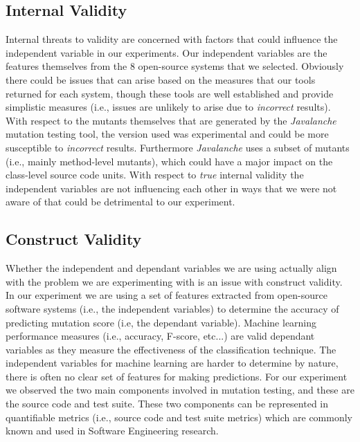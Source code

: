 \subsection{Internal Validity}
\label{subsec:conclusions_internal_validity}
Internal threats to validity are concerned with factors that could influence the independent variable in our experiments. Our independent variables are the features themselves from the 8 open-source systems that we selected. Obviously there could be issues that can arise based on the measures that our tools returned for each system, though these tools are well established and provide simplistic measures (i.e., issues are unlikely to arise due to \emph{incorrect} results). With respect to the mutants themselves that are generated by the \emph{Javalanche} mutation testing tool, the version used was experimental and could be more susceptible to \emph{incorrect} results. Furthermore \emph{Javalanche} uses a subset of mutants (i.e., mainly method-level mutants), which could have a major impact on the class-level source code units. With respect to \emph{true} internal validity the independent variables are not influencing each other in ways that we were not aware of that could be detrimental to our experiment. 


\subsection{Construct Validity}
\label{subsec:conclusions_construct_validity}
Whether the independent and dependant variables we are using actually align with the problem we are experimenting with is an issue with construct validity. In our experiment we are using a set of features extracted from open-source software systems (i.e., the independent variables) to determine the accuracy of predicting mutation score (i.e, the dependant variable). Machine learning performance measures (i.e., accuracy, F-score, etc...) are valid dependant variables as they measure the effectiveness of the classification technique. The independent variables for machine learning are harder to determine by nature, there is often no clear set of features for making predictions. For our experiment we observed the two main components involved in mutation testing, and these are the source code and test suite. These two components can be represented in quantifiable metrics (i.e., source code and test suite metrics) which are commonly known and used in Software Engineering research. 



